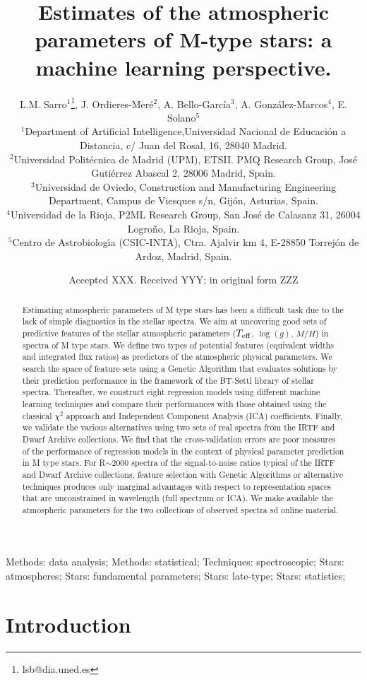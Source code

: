 \documentclass[a4paper,fleqn,usenatbib]{mnras}
\title[Estimating the atmospheric parameters of M-type
  stars]{Estimates of the atmospheric parameters of M-type stars: a
  machine learning perspective.}
\author[L. M. Sarro et al.]
          {
L.M. Sarro$^{1}$\thanks{lsb@dia.uned.es},
J. Ordieres-Mer\'e$^{2}$,       
A. Bello-Garc\'ia$^{3}$, 
A. Gonz\'alez-Marcos$^{4}$, 
E. Solano$^{5}$
\\
$^{1}$Department of Artificial Intelligence,Universidad Nacional de Educaci\'{o}n a Distancia, c/ Juan del Rosal, 16, 28040 Madrid.\\
$^{2}$Universidad Polit\'{e}cnica de Madrid (UPM), ETSII. PMQ Research Group, Jos\'{e} Guti\'{e}rrez Abascal 2, 28006 Madrid, Spain. \\
$^{3}$Universidad de Oviedo, Construction and Manufacturing Engineering Department, Campus de Viesques s/n, Gij\'{o}n, Asturias, Spain. \\
$^{4}$Universidad de la Rioja, P2ML Research Group, San Jos\'{e} de Calasanz 31, 26004 Logro\~{n}o, La Rioja, Spain. \\
$^{5}$Centro de Astrobiolog\'{\i}a (CSIC-INTA), Ctra. Ajalvir km 4, E-28850 Torrejón de Ardoz, Madrid, Spain.\\
}
\date{Accepted XXX. Received YYY; in original form ZZZ}
\begin{document}
 
\label{firstpage}
\pagerange{\pageref{firstpage}--\pageref{lastpage}}
\maketitle

\begin{abstract}
    Estimating atmospheric parameters of M type stars has been a
    difficult task due to the lack of simple diagnostics in the
    stellar spectra.  We aim at uncovering good sets of predictive
    features of the stellar atmospheric parameters ($T_{\rm eff}$,
    $\log(g)$, $M/H$) in spectra of M type stars. We define two types
    of potential features (equivalent widths and integrated flux
    ratios) as predictors of the atmospheric physical parameters. We
    search the space of feature sets using a Genetic Algorithm that
    evaluates solutions by their prediction performance in the
    framework of the BT-Settl library of stellar spectra. Thereafter,
    we construct eight regression models using different machine
    learning techniques and compare their performances with those
    obtained using the classical $\chi^2$ approach and Independent
    Component Analysis (ICA) coefficients. Finally, we validate the
    various alternatives using two sets of real spectra from the IRTF
    and Dwarf Archive collections.  We find that the cross-validation
    errors are poor measures of the performance of regression models
    in the context of physical parameter prediction in M type
    stars. For R$\sim$2000 spectra of the signal-to-noise ratios
    typical of the IRTF and Dwarf Archive collections, feature
    selection with Genetic Algorithms or alternative techniques
    produces only marginal advantages with respect to representation
    spaces that are unconstrained in wavelength (full spectrum or
    ICA). We make available the atmospheric parameters for the two
    collections of observed spectra sd online material.
\end{abstract}

\begin{keywords}
Methods: data analysis; Methods: statistical;
     Techniques: spectroscopic; Stars: atmospheres; Stars: fundamental
     parameters; Stars: late-type; Stars: statistics;
\end{keywords}

%

\section{Introduction}
\label{sec:intro}

\end{document}
